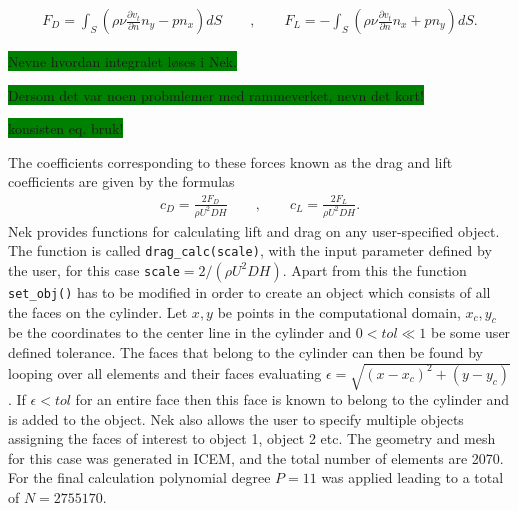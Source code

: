 \begin{align}
    F_D = \int_{S}(\rho \nu \frac{\partial v_t}{\partial n}n_y-pn_x)dS 
    \qquad , \qquad
    F_L = -\int_{S}(\rho \nu \frac{\partial v_t}{\partial n}n_x+pn_y)dS.
    \label{eq:dragnlift}
\end{align}


\colorbox{green}{Nevne hvordan integralet løses i Nek.}

\colorbox{green}{Dersom det var noen probmlemer med rammeverket, nevn det kort!}

\colorbox{green}{konsisten eq. bruk! }

The coefficients corresponding to these forces known as the drag and lift coefficients 
are given by the formulas 
\begin{align}
    c_D = \frac{2F_D}{\rho U^2 D H}
    \qquad , \qquad
    c_L = \frac{2F_L}{\rho U^2 D H}.
    \label{eq:dragnliftcoeffs}
\end{align}
Nek provides functions for calculating lift and drag on any user-specified object.
The function is called \verb|drag_calc(scale)|, with the input parameter 
defined by the user, for this case \verb|scale|$=2/(\rho U^2DH)$.  
Apart from this the function \verb|set_obj()| has to be modified in order to create an object 
which consists of all the faces on the cylinder.
Let $x,y$ be points in the computational domain, $x_c,y_c$ be the coordinates to the 
center line in the cylinder and $0<tol\ll1$ be some user defined tolerance. The faces that belong to the cylinder can then be found by 
looping over all elements and their faces evaluating $\epsilon = \sqrt{(x-x_c)^2+(y-y_c)}$.
If $\epsilon < tol$ for an entire face then this face is known to 
belong to the cylinder and is added to the object. Nek also allows the user to specify multiple objects 
assigning the faces of interest to object 1, object 2 etc. The geometry and mesh 
for this case was generated in ICEM, and the total number of elements are 2070. 
For the final calculation polynomial degree $P = 11$ was applied leading to a 
total of $N = 2755170$.

